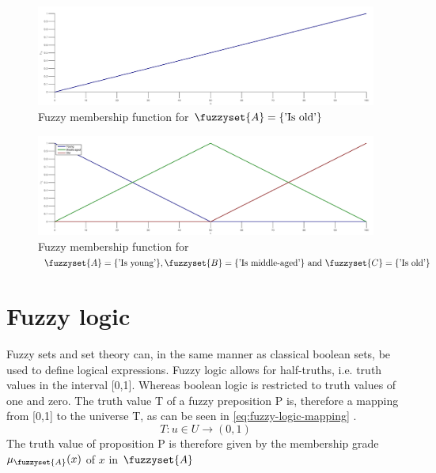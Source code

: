 \begin{figure}[H]
    \centering
    \includegraphics[width=\textwidth]{FMF_ex}
    \caption[Graphical representation of a single FMF]{Fuzzy membership function for $\protect\fuzzyset{A}=\left \{ \text{'Is old'} \right \}$}
    \label{fig:FMF_ex}
\end{figure}
\begin{figure}[H]
    \centering
    \includegraphics[width=\textwidth]{FMF_ex2}
    \caption[Graphical representation of multiple FMFs]{Fuzzy membership function for $\protect\fuzzyset{A}=\{\text{'Is young'}\}, \protect\fuzzyset{B}=\{\text{'Is middle-aged'\}}\text{ and }\protect\fuzzyset{C}=\{\text{'Is old'}\}$}
    \label{fig:FMF_ex2}
\end{figure}
\section{Fuzzy logic}
\label{section:fuzzy_logic}
Fuzzy sets and set theory can, in the same manner as classical boolean sets, be used to define logical expressions. Fuzzy logic allows for half-truths, i.e. truth values in the interval [0,1]. Whereas boolean logic is restricted to truth values of one and zero. The truth value T of a fuzzy preposition P is, therefore a mapping from [0,1] to the universe T, as can be seen in \ref{eq:fuzzy-logic-mapping} \cite{ross2009fuzzy}.
\begin{equation}
    T:u\in U\rightarrow (0,1)
    \label{eq:fuzzy-logic-mapping}
\end{equation}
The truth value of proposition P is therefore given by the membership grade $\mu_{\fuzzyset{A}}(x)$ of $x$ in $\fuzzyset{A}$

